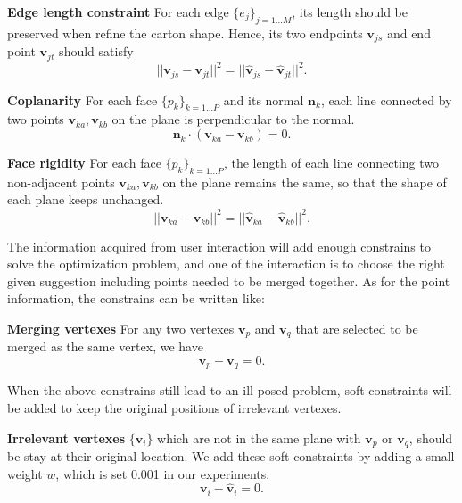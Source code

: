 \noindent
\textbf{Edge length constraint} 
For each edge $\{e_j\}_{j=1...M}$, its length should be preserved when refine the carton shape.
Hence, its two endpoints $\mathbf{v}_{js}$ and end point $\mathbf{v}_{jt}$ should satisfy 
\begin{equation}
||\mathbf{v}_{js} - \mathbf{v}_{jt}||^2 = ||\mathbf{\hat{v}}_{js} - \mathbf{\hat{v}}_{jt}||^2.
\label{equ:edge}
\end{equation}

\noindent
\textbf{Coplanarity} For each face $\{p_k\}_{k=1 \dots P}$ and its normal $\mathbf{n}_k$, each line connected by two points $\mathbf{v}_{ka}, \mathbf{v}_{kb}$ on the plane is perpendicular to the normal. 
\begin{equation}
\mathbf{n}_k \cdot (\mathbf{v}_{ka} - \mathbf{v}_{kb}) = 0.
\label{equ:coplane}
\end{equation}

\noindent
\textbf{Face rigidity} For each face $\{p_k\}_{k=1 \dots P}$, the length of each line connecting two non-adjacent points $\mathbf{v}_{ka}, \mathbf{v}_{kb}$ on the plane remains the same, so that the shape of each plane keeps unchanged.
\begin{equation}
||\mathbf{v}_{ka} - \mathbf{v}_{kb}||^2 = ||\hat{\mathbf{v}}_{ka} - \hat{\mathbf{v}}_{kb}||^2.
\label{equ:plane}
\end{equation}

The information acquired from user interaction will add enough constrains to solve the optimization problem, and one of the interaction is to choose the right given suggestion including points needed to be merged together. As for the point information, the constrains can be written like:

\noindent
\textbf{Merging vertexes} For any two vertexes $\mathbf{v}_p$ and $\mathbf{v}_q$ that are selected to be merged as the same vertex, we have 
\begin{equation}
\mathbf{v}_p - \mathbf{v}_q = 0.
\label{equ:point}
\end{equation}


When the above constrains still lead to an ill-posed problem, soft constraints will be added to keep the original positions of irrelevant vertexes. 


\noindent
\textbf{Irrelevant vertexes} $\{\mathbf{v}_i\}$ which are not in the same plane with $\mathbf{v}_p$ or $\mathbf{v}_q$, should be stay at their original location. 
We add these soft constraints by adding a small weight $w$, which is set 0.001 in our experiments. 
\begin{equation}
\mathbf{v}_i - \mathbf{\hat{v}}_i = 0.
\label{equ:irrelevant}
\end{equation}

